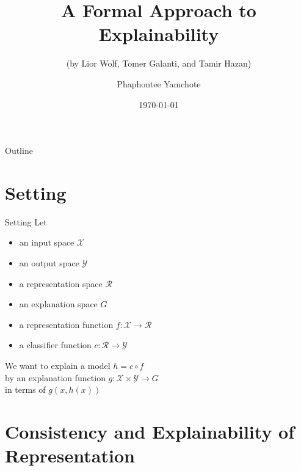 \documentclass[10pt, aspectratio=169]{beamer}
\title{A Formal Approach to Explainability}
\subtitle{(by Lior Wolf, Tomer Galanti, and Tamir Hazan)}
\date{\today}
\author{Phaphontee Yamchote}
\begin{document}
	\titlepage
	\begin{frame}{Outline}
		\tableofcontents
	\end{frame}
	\section{Setting}
	\begin{frame}{Setting}
		Let 
		\begin{itemize}
			\item an input space $\mathcal{X}$
			\item an output space $\mathcal{Y}$ 
			\item a representation space $\mathcal{R}$
			\item an explanation space $G$
			\item a representation function $f:\mathcal{X}\to\mathcal{R}$
			\item a classifier function $c:\mathcal{R}\to\mathcal{Y}$
		\end{itemize}
		
		We want to explain a model $h = c\circ f$\\
		by an explanation function $g:\mathcal{X}\times\mathcal{Y}\to G$\\
		in terms of $g(x,h(x))$
	\end{frame}
	
	\section{Consistency and Explainability of Representation}
	
\end{document}
